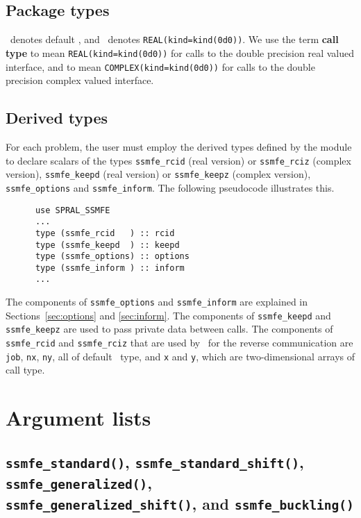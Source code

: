 \subsection{Package types} 

\Integer\ denotes default \Integer, and \REALDP\ denotes
\texttt{REAL(kind=kind(0d0))}. We use the term {\bf call type} to mean
\texttt{REAL(kind=kind(0d0))} for calls to the double precision real valued
interface, and to mean \texttt{COMPLEX(kind=kind(0d0))} for calls to the double
precision complex valued interface.

\subsection{Derived types}
\label{derived types}
For each problem, the user must employ the derived types defined by the
module to declare scalars of the types 
{\tt ssmfe\_rcid} (real version) or 
{\tt ssmfe\_rciz} (complex version), 
{\tt ssmfe\_keepd} (real version) or
{\tt ssmfe\_keepz} (complex version),
{\tt ssmfe\_options} and 
{\tt ssmfe\_inform}.
The following pseudocode illustrates this.
\begin{verbatim}
      use SPRAL_SSMFE    
      ...
      type (ssmfe_rcid   ) :: rcid
      type (ssmfe_keepd  ) :: keepd
      type (ssmfe_options) :: options
      type (ssmfe_inform ) :: inform
      ...
\end{verbatim}

The components of 
{\tt ssmfe\_options} and 
{\tt ssmfe\_inform} are explained
in Sections~\ref{sec:options} and \ref{sec:inform}. 
The components of {\tt ssmfe\_keepd} and {\tt ssmfe\_keepz} 
are used to pass 
private data between calls. 
The components of
{\tt ssmfe\_rcid} and 
{\tt ssmfe\_rciz} 
that are used by \fullpackagename\ 
for the reverse communication are
{\tt job},
{\tt nx},
{\tt ny}, all of default \Integer\ type,
and
{\tt x} and {\tt y},
which are 
two-dimensional arrays
of call type.


\section{Argument lists}

\subsection{%
   \texttt{ssmfe\_standard()},
   \texttt{ssmfe\_standard\_shift()},
   \texttt{ssmfe\_generalized()},\\
   \texttt{ssmfe\_generalized\_shift()}, and
   \texttt{ssmfe\_buckling()}
}

